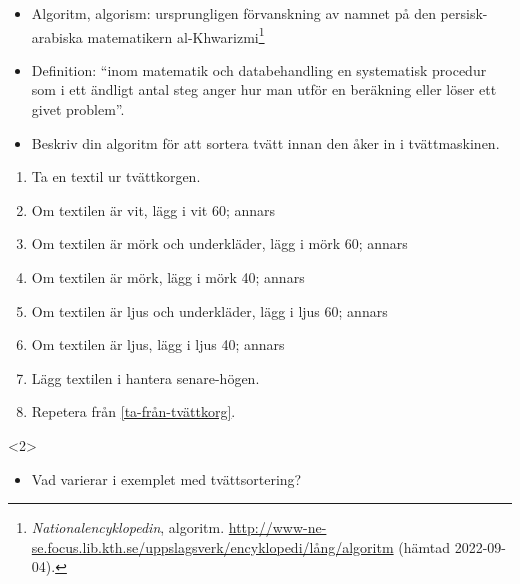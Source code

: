 \begin{frame}[fragile]
  \begin{definition}[Algoritm]
    \begin{itemize}
      \item Algoritm, algorism: ursprungligen förvanskning av namnet på den 
        persisk-arabiska matematikern al-Khwarizmi\footnote{%
          \emph{Nationalencyklopedin},
          algoritm. 
          \url{http://www-ne-se.focus.lib.kth.se/uppslagsverk/encyklopedi/lång/algoritm}
          (hämtad 2022-09-04).
        }
      \item Definition: \enquote{inom matematik och databehandling en 
          systematisk procedur som i ett ändligt antal steg anger hur man utför 
        en beräkning eller löser ett givet problem}.
    \end{itemize}
  \end{definition}
\end{frame}

\begin{frame}
  \begin{exercise}
    \begin{itemize}
      \item Beskriv din algoritm för att sortera tvätt innan den åker in i 
        tvättmaskinen.
    \end{itemize}
  \end{exercise}
\end{frame}

\begin{frame}[fragile]
  \begin{example}
    \begin{enumerate}
      \item \label{ta-från-tvättkorg} Ta \alert<3>{en textil} ur tvättkorgen.
      \item Om \alert<3>{textilen} är vit, lägg i vit 60; annars
      \item Om \alert<3>{textilen} är mörk och underkläder, lägg i mörk 60; 
        annars
      \item Om \alert<3>{textilen} är mörk, lägg i mörk 40; annars
      \item Om \alert<3>{textilen} är ljus och underkläder, lägg i ljus 60; 
        annars
      \item Om \alert<3>{textilen} är ljus, lägg i ljus 40; annars
        \item Lägg \alert<3>{textilen} i hantera senare-högen.
      \item Repetera från \ref{ta-från-tvättkorg}.
    \end{enumerate}
  \end{example}

  \begin{onlyenv}<2>
    \begin{exercise}
      \begin{itemize}
        \item Vad varierar i exemplet med tvättsortering?
      \end{itemize}
    \end{exercise}
  \end{onlyenv}
\end{frame}

